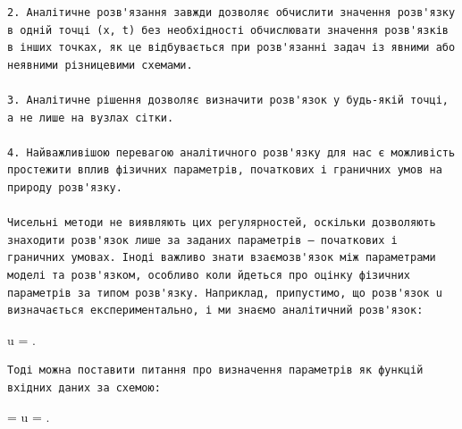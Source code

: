 \documentclass[
  ukrainian,
]{article}
\begin{document}
\begin{verbatim}
2. Аналітичне розв'язання завжди дозволяє обчислити значення розв'язку в одній точці (x, t) без необхідності обчислювати значення розв'язків в інших точках, як це відбувається при розв'язанні задач із явними або неявними різницевими схемами.

3. Аналітичне рішення дозволяє визначити розв'язок у будь-якій точці, а не лише на вузлах сітки.

4. Найважливішою перевагою аналітичного розв'язку для нас є можливість простежити вплив фізичних параметрів, початкових і граничних умов на природу розв'язку.

Чисельні методи не виявляють цих регулярностей, оскільки дозволяють знаходити розв'язок лише за заданих параметрів — початкових і граничних умовах. Іноді важливо знати взаємозв'язок між параметрами моделі та розв'язком, особливо коли йдеться про оцінку фізичних параметрів за типом розв'язку. Наприклад, припустимо, що розв'язок u визначається експериментально, і ми знаємо аналітичний розв'язок:
\end{verbatim}

u = .

\begin{verbatim}
Тоді можна поставити питання про визначення параметрів як функцій вхідних даних за схемою:
\end{verbatim}

 =  u = .
\end{document}
